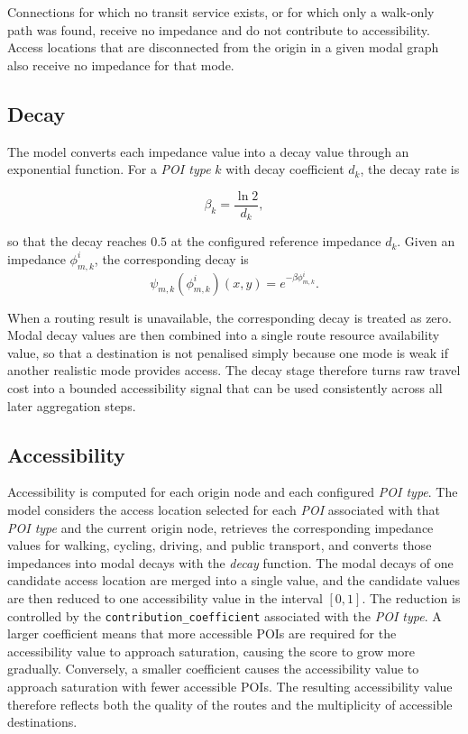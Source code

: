 \documentclass{article}
\begin{document}
Connections for which no transit service exists, or for which only a walk-only
path was found, receive no impedance and do not contribute to accessibility.
Access locations that are disconnected from the origin in a given modal graph
also receive no impedance for that mode.

\subsection{Decay}
The model converts each impedance value into a decay value through an
exponential function. For a \emph{POI type} \(k\) with decay coefficient \(d_k\), the decay rate is

\begin{equation}
    \beta_k = \frac{\ln 2}{d_k},
\end{equation}

\noindent so that the decay reaches \(0.5\) at the configured reference
impedance \(d_k\).
Given an impedance \(\phi^i_{m,k}\), the corresponding
decay is
\begin{equation}
    \psi_{m,k}(\phi_{m,k}^i)(x,y) = e^{-\beta \phi^i_{m,k}}.
\end{equation}

When a routing result is unavailable, the corresponding decay is treated as
zero. Modal decay values are then combined into a single route resource
availability value, so that a destination is not penalised simply because one
mode is weak if another realistic mode provides access. The decay stage
therefore turns raw travel cost into a bounded accessibility signal that can be
used consistently across all later aggregation steps.

\subsection{Accessibility}
Accessibility is computed for each origin node and each configured
\emph{POI type}. The model considers the access location selected for each \emph{POI}
associated with that \emph{POI type} and the current origin node, retrieves the corresponding impedance values for walking, cycling, driving, and public transport, and converts those impedances
into modal decays with the \emph{decay} function. The modal decays of one
candidate access location are merged into a single value, and the candidate
values are then reduced to one accessibility value in the interval \([0,1]\).
The reduction is controlled by the \texttt{contribution\_coefficient}
associated with the \emph{POI type}. A larger coefficient means that more accessible POIs are required for the accessibility value to approach saturation, causing the score to grow more
gradually. Conversely, a smaller coefficient causes the accessibility value
to approach saturation with fewer accessible POIs. The resulting accessibility value therefore reflects both the
quality of the routes and the multiplicity of accessible destinations.
\end{document}

